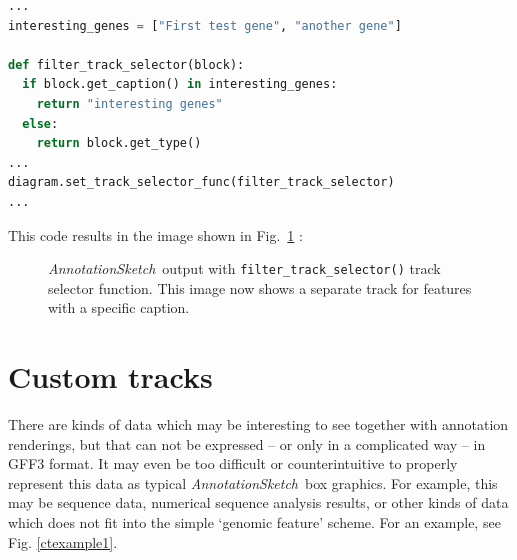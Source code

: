 \documentclass[a4paper]{scrreprt}
\newcommand{\AnnotationSketch}{\emph{AnnotationSketch}\ }
\begin{document}
\begin{lstlisting}[language=Python, showstringspaces=false,numbers=none,frame=single]
...
interesting_genes = ["First test gene", "another gene"]

def filter_track_selector(block):
  if block.get_caption() in interesting_genes:
    return "interesting genes"
  else:
    return block.get_type()
...
diagram.set_track_selector_func(filter_track_selector)
...
\end{lstlisting}

This code results in the image shown in Fig.~\ref{tsexample3} :

\begin{figure}[ht]
\caption{\AnnotationSketch output with \texttt{filter\_track\_selector()} track selector function. This image now shows a separate track for features with a specific caption.}
\label{tsexample3}
\end{figure}

\section{Custom tracks}
There are kinds of data which may be interesting to see together with annotation renderings, but that can not be expressed -- or only in a complicated way -- in GFF3 format. It may even be too difficult or counterintuitive to properly represent this data as typical \AnnotationSketch box graphics. For example, this may be sequence data, numerical sequence analysis results, or other kinds of data which does not fit into the simple ‘genomic feature’ scheme. For an example, see Fig. \ref{ctexample1}.
\end{document}
